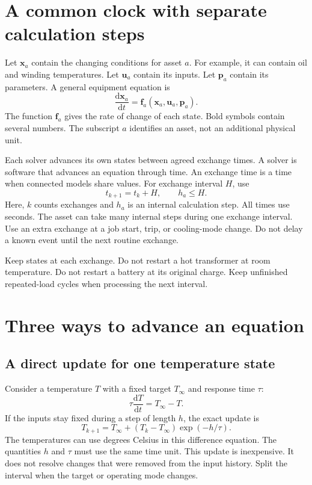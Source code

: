 \documentclass[11pt,a4paper]{report}
\newcommand{\dd}{\mathrm{d}}
\begin{document}
\section{A common clock with separate calculation steps}
Let $\mathbf{x}_a$ contain the changing conditions for asset $a$.
For example, it can contain oil and winding temperatures.
Let $\mathbf{u}_a$ contain its inputs.
Let $\mathbf{p}_a$ contain its parameters.
A general equipment equation is
\begin{equation}
\frac{\dd\mathbf{x}_a}{\dd t}
=\mathbf{f}_a(\mathbf{x}_a,\mathbf{u}_a,\mathbf{p}_a).
\label{eq:general-state}
\end{equation}
The function $\mathbf{f}_a$ gives the rate of change of each state.
Bold symbols contain several numbers.
The subscript $a$ identifies an asset, not an additional physical unit.

Each solver advances its own states between agreed exchange times.
A solver is software that advances an equation through time.
An exchange time is a time when connected models share values.
For exchange interval $H$, use
\begin{equation}
t_{k+1}=t_k+H,\qquad
h_a\leq H.
\end{equation}
Here, $k$ counts exchanges and $h_a$ is an internal calculation step.
All times use seconds.
The asset can take many internal steps during one exchange interval.
Use an extra exchange at a job start, trip, or cooling-mode change.
Do not delay a known event until the next routine exchange.

Keep states at each exchange.
Do not restart a hot transformer at room temperature.
Do not restart a battery at its original charge.
Keep unfinished repeated-load cycles when processing the next interval.

\section{Three ways to advance an equation}
\subsection{A direct update for one temperature state}
Consider a temperature $T$ with a fixed target $T_\infty$ and response time $\tau$:
\begin{equation}
\tau\frac{\dd T}{\dd t}=T_\infty-T.
\end{equation}
If the inputs stay fixed during a step of length $h$, the exact update is
\begin{equation}
T_{k+1}=T_\infty+(T_k-T_\infty)\exp(-h/\tau).
\label{eq:exact-lag}
\end{equation}
The temperatures can use degrees Celsius in this difference equation.
The quantities $h$ and $\tau$ must use the same time unit.
This update is inexpensive.
It does not resolve changes that were removed from the input history.
Split the interval when the target or operating mode changes.
\end{document}
